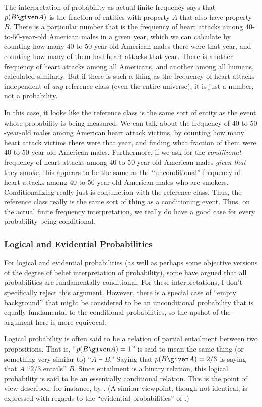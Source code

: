 The interpretation of probability as actual finite frequency says that $p(B \given A)$ is the fraction of entities with property $A$ that also have property $B$. There is a particular number that is the frequency of heart attacks among $40$-to-$50$-year-old American males in a given year, which we can calculate by counting how many $40$-to-$50$-year-old American males there were that year, and counting how many of them had heart attacks that year. There is another frequency of heart attacks among all Americans, and another among all humans, calculated similarly. But if there is such a thing as the frequency of heart attacks independent of \emph{any} reference class (even the entire universe), it is just a number, not a probability.

In this case, it looks like the reference class is the same sort of entity as the event whose probability is being measured. We can talk about the frequency of $40$-to-$50$-year-old males among American heart attack victims, by counting how many heart attack victims there were that year, and finding what fraction of them were $40$-to-$50$-year-old American males. Furthermore, if we ask for the \emph{conditional} frequency of heart attacks among $40$-to-$50$-year-old American males \emph{given that} they smoke, this appears to be the same as the ``unconditional'' frequency of heart attacks among $40$-to-$50$-year-old American males who are smokers. Conditionalizing really just is conjunction with the reference class. Thus, the reference class really is the same sort of thing as a conditioning event. Thus, on the actual finite frequency interpretation, we really do have a good case for every probability being conditional.

\subsubsection{Logical and Evidential Probabilities}

For logical and evidential probabilities (as well as perhaps some objective versions of the degree of belief interpretation of probability), some have argued that all probabilities are fundamentally conditional. For these interpretations, I don't specifically reject this argument. However, there is a special case of ``empty background'' that might be considered to be an unconditional probability that is equally fundamental to the conditional probabilities, so the upshot of the argument here is more equivocal.

Logical probability is often said to be a relation of partial entailment between two propositions. That is, ``$p(B \given A)=1$'' is said to mean the same thing (or something very similar to) ``$A\vdash B$.'' Saying that $p(B \given A)=2/3$ is saying that $A$ ``$2/3$ entails'' $B$. Since entailment is a binary relation, this logical probability is said to be an essentially conditional relation. This is the point of view described, for instance, by \citet{keynes}. (A similar viewpoint, though not identical, is expressed with regards to the ``evidential probabilities'' of \citealp{kail}.)

